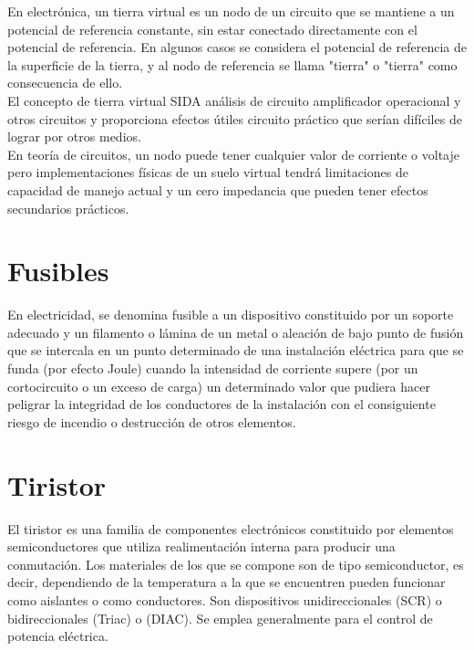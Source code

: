 \documentclass{article}
\begin{document}
En electrónica, un tierra virtual es un nodo de un circuito que se mantiene a un potencial de referencia constante, sin estar conectado directamente con el potencial de referencia. En algunos casos se considera el potencial de referencia de la superficie de la tierra, y al nodo de referencia se llama "tierra" o "tierra" como consecuencia de ello.\citep{TieV}\\

El concepto de tierra virtual SIDA análisis de circuito amplificador operacional y otros circuitos y proporciona efectos útiles circuito práctico que serían difíciles de lograr por otros medios.\citep{TieV}\\

En teoría de circuitos, un nodo puede tener cualquier valor de corriente o voltaje pero implementaciones físicas de un suelo virtual tendrá limitaciones de capacidad de manejo actual y un cero impedancia que pueden tener efectos secundarios prácticos.\citep{TieV}\\

\section{Fusibles}

En electricidad, se denomina fusible a un dispositivo constituido por un soporte adecuado y un filamento o lámina de un metal o aleación de bajo punto de fusión que se intercala en un punto determinado de una instalación eléctrica para que se funda (por efecto Joule) cuando la intensidad de corriente supere (por un cortocircuito o un exceso de carga) un determinado valor que pudiera hacer peligrar la integridad de los conductores de la instalación con el consiguiente riesgo de incendio o destrucción de otros elementos.\citep{Fus}

\section{Tiristor}

El tiristor es una familia de componentes electrónicos constituido por elementos semiconductores que utiliza realimentación interna para producir una conmutación. Los materiales de los que se compone son de tipo semiconductor, es decir, dependiendo de la temperatura a la que se encuentren pueden funcionar como aislantes o como conductores. Son dispositivos unidireccionales (SCR) o bidireccionales (Triac) o (DIAC). Se emplea generalmente para el control de potencia eléctrica.\citep{Tirs}\\
\end{document}
